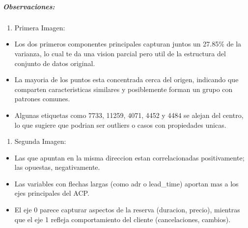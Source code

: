 \documentclass[11pt]{article}
\providecommand{\tightlist}{%
      \setlength{\itemsep}{0pt}\setlength{\parskip}{0pt}}
\begin{document}
    \begin{center}
    \end{center}
    { \hspace*{\fill} \\}
    
    \begin{center}
    \end{center}
    { \hspace*{\fill} \\}
    
    \subparagraph{Observaciones:}\label{observaciones}

\begin{enumerate}
\def\labelenumi{\arabic{enumi}.}
\tightlist
\item
  Primera Imagen:
\end{enumerate}

\begin{itemize}
\tightlist
\item
  Los dos primeros componentes principales capturan juntos un 27.85\% de
  la varianza, lo cual te da una vision parcial pero util de la
  estructura del conjunto de datos original.
\item
  La mayoria de los puntos esta concentrada cerca del origen, indicando
  que comparten caracteristicas similares y posiblemente forman un grupo
  con patrones comunes.
\item
  Algunas etiquetas como 7733, 11259, 4071, 4452 y 4484 se alejan del
  centro, lo que sugiere que podrian ser outliers o casos con
  propiedades unicas.
\end{itemize}

\begin{enumerate}
\def\labelenumi{\arabic{enumi}.}
\setcounter{enumi}{1}
\tightlist
\item
  Segunda Imagen:
\end{enumerate}

\begin{itemize}
\tightlist
\item
  Las que apuntan en la misma direccion estan correlacionadas
  positivamente; las opuestas, negativamente.
\item
  Las variables con flechas largas (como adr o lead\_time) aportan mas a
  los ejes principales del ACP.
\item
  El eje 0 parece capturar aspectos de la reserva (duracion, precio),
  mientras que el eje 1 refleja comportamiento del cliente
  (cancelaciones, cambios).
\end{itemize}
\end{document}
